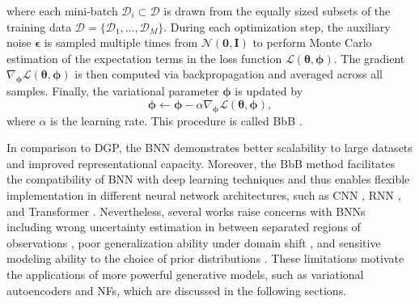 where each mini-batch $\mathcal{D}_i\subset\mathcal{D}$ is drawn from the equally sized subsets of the training data $\mathcal{D}=\{\mathcal{D}_1,\dots,\mathcal{D}_M\}$. During each optimization step, the auxiliary noise $\boldsymbol{\epsilon}$ is sampled multiple times from $\mathcal{N}(\boldsymbol{0}, \boldsymbol{I})$ to perform Monte Carlo estimation of the expectation terms in the loss function $\mathcal{L}(\boldsymbol{\theta}, \boldsymbol{\phi})$. The gradient $\nabla_{\boldsymbol{\phi}}\mathcal{L}(\boldsymbol{\theta}, \boldsymbol{\phi})$ is then computed via backpropagation and averaged across all samples. Finally, the variational parameter $\boldsymbol{\phi}$ is updated by 
\begin{equation}
    \boldsymbol{\phi}\leftarrow\boldsymbol{\phi}-\alpha\nabla_{\boldsymbol{\phi}}\mathcal{L}(\boldsymbol{\theta}, \boldsymbol{\phi}),
\end{equation}
where $\alpha$ is the learning rate. This procedure is called \ac{BbB} \citep{blundell2015bbb}.

In comparison to \ac{DGP}, the \ac{BNN} demonstrates better scalability to large datasets and improved representational capacity. Moreover, the \ac{BbB} method facilitates the compatibility of \ac{BNN} with deep learning techniques and thus enables flexible implementation in different neural network architectures, such as \ac{CNN} \citep{shridhar2019bcnn}, \ac{RNN} \citep{fortunato2019brnn}, and Transformer \citep{müller2024transbi}. Nevertheless, several works raise concerns with BNNs including wrong uncertainty estimation in between separated regions of observations \citep{foong2019inbetween, foong2020bnn}, poor generalization ability under domain shift \citep{izmailov2021bnnp}, and sensitive modeling ability to the choice of prior distributions \citep{silvestro2020prior}. These limitations motivate the applications of more powerful generative models, such as variational autoencoders and \acp{NF}, which are discussed in the following sections.

